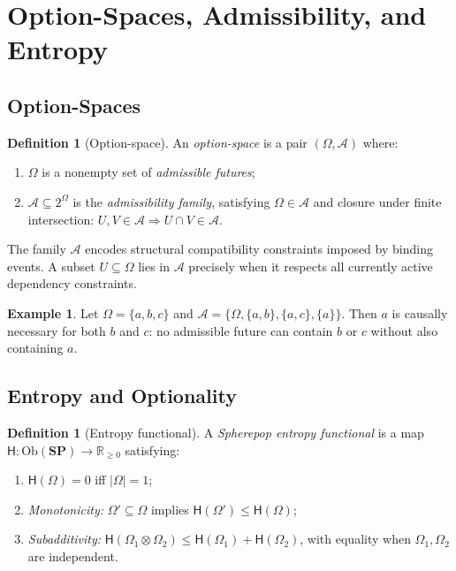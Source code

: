 \documentclass[12pt,a4paper]{article}
\theoremstyle{definition}
\newtheorem{definition}[theorem]{Definition}
\newtheorem{example}[theorem]{Example}
\theoremstyle{remark}
\newcommand{\Rnn}{\mathbb{R}_{\ge 0}}
\newcommand{\Ent}{\mathsf{H}}
\newcommand{\SP}{\mathbf{SP}}
\newcommand{\Ob}{\mathrm{Ob}}
\newcommand{\tensor}{\otimes}
\begin{document}
\section{Option-Spaces, Admissibility, and Entropy}
\label{sec:ontology}

\subsection{Option-Spaces}

\begin{definition}[Option-space]
\label{def:optspace}
An \emph{option-space} is a pair $(\Omega,\mathcal{A})$ where:
\begin{enumerate}[label=(\roman*)]
\item $\Omega$ is a nonempty set of \emph{admissible futures};
\item $\mathcal{A}\subseteq 2^\Omega$ is the \emph{admissibility family}, satisfying
  $\Omega\in\mathcal{A}$ and closure under finite intersection:
  $U,V\in\mathcal{A}\Rightarrow U\cap V\in\mathcal{A}$.
\end{enumerate}
\end{definition}

The family $\mathcal{A}$ encodes structural compatibility constraints imposed by
binding events. A subset $U\subseteq\Omega$ lies in $\mathcal{A}$ precisely when it
respects all currently active dependency constraints.

\begin{example}
Let $\Omega=\{a,b,c\}$ and $\mathcal{A}=\{\Omega,\{a,b\},\{a,c\},\{a\}\}$. Then
$a$ is causally necessary for both $b$ and $c$: no admissible future can contain $b$
or $c$ without also containing $a$.
\end{example}

\subsection{Entropy and Optionality}

\begin{definition}[Entropy functional]
\label{def:entropy}
A \emph{Spherepop entropy functional} is a map $\Ent:\Ob(\SP)\to\Rnn$ satisfying:
\begin{enumerate}[label=(\roman*)]
\item $\Ent(\Omega)=0$ iff $|\Omega|=1$;
\item \emph{Monotonicity:} $\Omega'\subseteq\Omega$ implies $\Ent(\Omega')\le\Ent(\Omega)$;
\item \emph{Subadditivity:} $\Ent(\Omega_1\tensor\Omega_2)\le\Ent(\Omega_1)+\Ent(\Omega_2)$,
  with equality when $\Omega_1,\Omega_2$ are independent.
\end{enumerate}
\end{definition}
\end{document}
